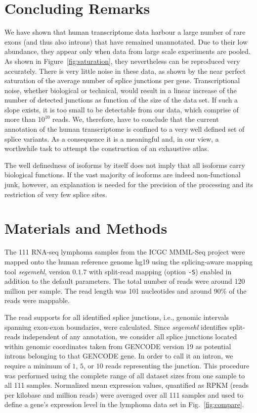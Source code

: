 \documentclass[ncrna,article,submit,moreauthors,pdftex,10pt,a4paper]{mdpi}
\begin{document}
\section{Concluding Remarks} 

We have shown that human transcriptome data harbour a large number of rare
exons (and thus also introns) that have remained unannotated. Due to their
low abundance, they appear only when data from large scale experiments are
pooled. As shown in Figure~\ref{fig:saturation}, they nevertheless can be
reproduced very accurately. There is very little noise in these data, as
shown by the near perfect saturation of the average number of splice
junctions per gene. Transcriptional noise, whether biological or technical,
would result in a linear increase of the number of detected junctions as
function of the size of the data set. If such a slope exists, it is too
small to be detectable from our data, which comprise of more than $10^{10}$
reads. We, therefore, have to conclude that the current annotation of the human transcriptome is
confined to a very well defined set of splice variants. As a consequence it
is a meaningful and, in our view, a worthwhile task to attempt the
construction of an exhaustive atlas.

The well definedness of isoforms by itself does not imply that all isoforms
carry biological functions. If the vast majority of isoforms are indeed
non-functional junk, however, an explanation is needed for the precision of
the processing and its restriction of very few splice sites.

\section{Materials and Methods}

The 111 RNA-seq lymphoma samples from the ICGC MMML-Seq project
\cite{Richter:12a} were mapped onto the human reference genome hg19 using
the splicing-aware mapping tool \textit{segemehl}, version $0.1.7$
\cite{Hoffmann:09a,Hoffmann:14a} with split-read mapping (option
\texttt{-S}) enabled in addition to the default parameters. The total
number of reads were around 120 million per sample. The read length was 101 nucleotides
and around 90\% of the reads were mappable.

The read supports for all identified splice junctions, i.e., genomic
intervals spanning exon-exon boundaries, were calculated. Since
\textit{segemehl} identifies split-reads independent of any annotation,
we consider all splice junctions located within genomic coordinates taken
from GENCODE version 19 as potential introns belonging to that GENCODE
gene. In order to call it an intron, we require a minimum of $1$, $5$, or
$10$ reads representing the junction.  This procedure was performed using
the complete range of all dataset sizes from one sample to all 111 samples.
Normalized mean expression values, quantified as RPKM (reads per kilobase
and million reads) were averaged over all 111 samples and used to define a
gene's expression level in the lymphoma data set in Fig.\ \ref{fig:compare}. 
\end{document}
